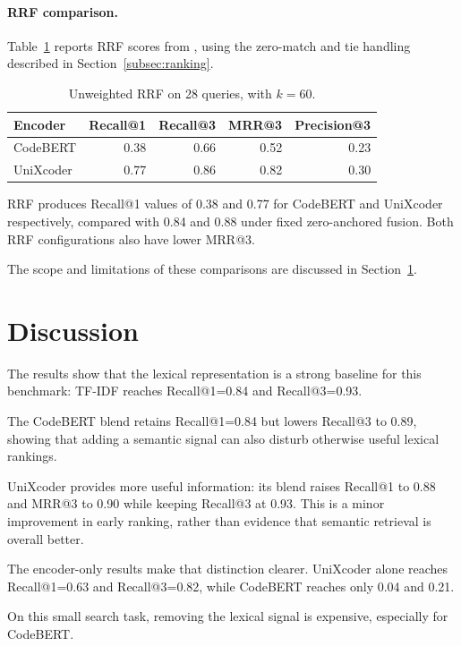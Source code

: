 \documentclass[12pt]{article}
\begin{document}
\paragraph{RRF comparison.}
Table~\ref{tab:rrf-results} reports RRF scores from ,
using the zero-match and tie handling described in Section~\ref{subsec:ranking}.

\begin{table}[htbp]
  \centering
  \small
  \begin{tabular}{lrrrr}
    \toprule
    Encoder & Recall@1 & Recall@3 & MRR@3 & Precision@3 \\
    \midrule
    CodeBERT & 0.38 & 0.66 & 0.52 & 0.23 \\
    UniXcoder & 0.77 & 0.86 & 0.82 & 0.30 \\
    \bottomrule
  \end{tabular}
  \caption{Unweighted RRF on 28 queries, with \(k=60\).}
  \label{tab:rrf-results}
\end{table}

RRF produces Recall@1 values of 0.38 and 0.77 for CodeBERT and UniXcoder respectively, compared with 0.84 and 0.88
under fixed zero-anchored fusion. Both RRF configurations also have lower MRR@3.

The scope and limitations of these comparisons are discussed in Section~\ref{sec:discussion}.

\section{Discussion}
\label{sec:discussion}

The results show that the lexical representation is a strong baseline for this benchmark:
TF-IDF reaches Recall@1=0.84 and Recall@3=0.93.

The CodeBERT blend retains Recall@1=0.84 but lowers Recall@3 to 0.89, showing that adding a semantic signal can
also disturb otherwise useful lexical rankings.

UniXcoder provides more useful information: its blend raises Recall@1 to 0.88 and MRR@3 to 0.90 while keeping Recall@3 at 0.93.
This is a minor improvement in early ranking, rather than evidence that semantic retrieval is overall better.

The encoder-only results make that distinction clearer.
UniXcoder alone reaches Recall@1=0.63 and Recall@3=0.82, while CodeBERT reaches only 0.04 and 0.21.

On this small search task, removing the lexical signal is expensive, especially for CodeBERT.
\end{document}
